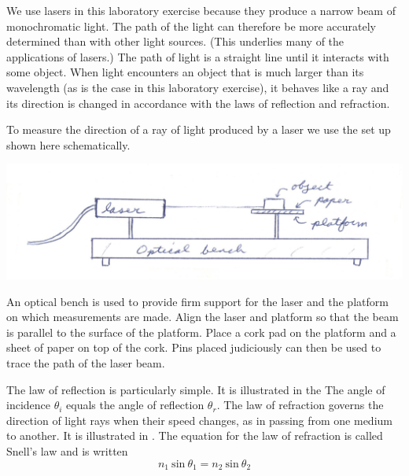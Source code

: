 \begin{multicols}{2}
We use lasers in this laboratory exercise because they produce a narrow beam of monochromatic light.  The path of the light can therefore be more accurately determined than with other light sources.  (This underlies many of the applications of lasers.)  The path of light is a straight line until it interacts with some object.  When light encounters an object that is much larger than its wavelength  (as is the case in this laboratory exercise), it behaves like a ray and its direction is changed in accordance with the laws of reflection and refraction.
 
To measure the direction of a ray of light produced by a laser we use the set up shown here schematically.


\begin{center}
	\includegraphics[scale=0.6]{5bgraf/fig_14}
	\label{f:fig14}
\end{center}


An optical bench is used to provide firm support for the laser and the platform on which measurements are made.  Align the laser and platform so that the beam is parallel to the surface of the platform.  Place a cork pad on the platform and a sheet of paper on top of the cork.  Pins placed judiciously can then be used to trace the path of the laser beam.

The law of reflection is particularly simple.  It is illustrated in the   The angle of incidence $\theta_i$ equals the angle of reflection $\theta_r$.  The law of refraction governs the direction of light rays when their speed changes, as in passing from one medium to another.  It is illustrated in .  The equation for the law of refraction is called Snell's law and is written
\begin {equation} \label{e:snell}
n_1 \ \text{sin} \ \theta_1 = n_2 \ \text{sin} \ \theta_2
\end {equation}


\end{multicols}

